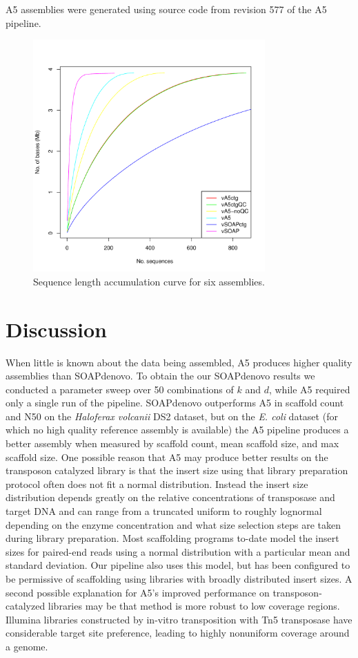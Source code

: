 \documentclass{bioinfo}
\begin{document}
A5 assemblies were generated using source code from revision 577 of the A5 pipeline.

\begin{figure}[t]
\includegraphics[width=3.5in]{volc_accum_plot.pdf}
\vspace{-1cm}
\caption{Sequence length accumulation curve for six assemblies.}\label{fig:03}
\end{figure}

\section{Discussion}

When little is known about the data being assembled, A5 produces higher quality assemblies 
than SOAPdenovo. To obtain the our SOAPdenovo results we conducted a parameter sweep 
over 50 combinations of $k$ and $d$, while A5 required
only a single run of the pipeline.
SOAPdenovo outperforms A5 in scaffold count and N50 on the \textit{Haloferax volcanii} DS2 dataset, but on the \textit{E. coli} dataset 
(for which no high quality reference assembly is available) the
A5 pipeline produces a better assembly when measured by scaffold count, mean scaffold size, and max scaffold size.
One possible reason that A5 may produce better results on the transposon catalyzed library is that the insert size using
that library preparation protocol often does not fit a normal distribution.  Instead the insert size 
distribution depends greatly on the relative concentrations of transposase and target DNA and can range from a truncated uniform
to roughly lognormal depending on the enzyme concentration and what size selection steps are taken during library preparation.
Most scaffolding programs to-date model the insert sizes for paired-end reads using a normal distribution with a particular
mean and standard deviation. Our pipeline also uses this model, but has been configured to be permissive of scaffolding
using libraries with broadly distributed insert sizes.  A second possible explanation for A5's improved performance on transposon-catalyzed 
libraries may be that method is more robust to low coverage regions.  Illumina libraries constructed by in-vitro 
transposition with Tn5 transposase have considerable target site preference, leading to highly nonuniform coverage around a genome.
\end{document}
